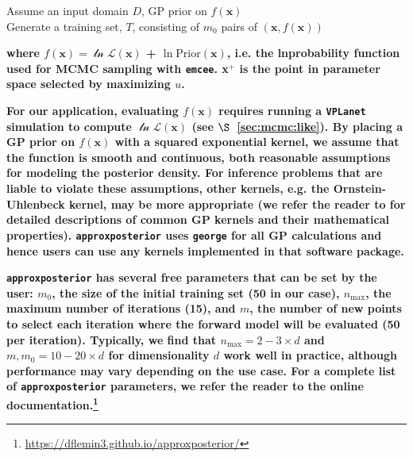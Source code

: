 \documentclass[twocolumn]{aastex62}
\newcommand{\xxx}[1]{{\textbf{#1}}}
\newcommand{\vplanet}[0]{\texttt{VPLanet}\xspace}
\newcommand{\emcee}[0]{\texttt{emcee}\xspace}
\newcommand{\approxposterior}[0]{\texttt{approxposterior}\xspace}
\begin{document}
\begin{algorithm}[H] \label{app:algo}
\SetAlgoLined
 Assume an input domain $D$, GP prior on $f(\textbf{x})$ \\
 Generate a training set, $T$, consisting of $m_0$ pairs of $(\textbf{x}, f(\textbf{x}))$ \\
\caption{\approxposterior Approximate Inference Pseudo Code}
\end{algorithm}
\xxx{where $f(\textbf{x}) = \mathcal{\ln L}(\textbf{x})$ + $\ln \mathrm{Prior}(\textbf{x})$, i.e. the lnprobability function used for MCMC sampling with \emcee. \textbf{x}$^+$ is the point in parameter space selected by maximizing $u$.} 

\xxx{For our application, evaluating $f(\textbf{x})$ requires running a \vplanet simulation to compute $\mathcal{\ln L}(\textbf{x})$ (see $\S$~\ref{sec:mcmc:like}). By placing a GP prior on $f(\textbf{x})$ with a squared exponential kernel, we assume that the function is smooth and continuous, both reasonable assumptions for modeling the posterior density. For inference problems that are liable to violate these assumptions, other kernels, e.g. the Ornstein-Uhlenbeck kernel, may be more appropriate (we refer the reader to \citet{Rasmussen2006} for detailed descriptions of common GP kernels and their mathematical properties). \approxposterior uses \texttt{george} \citep{george} for all GP calculations and hence users can use any kernels implemented in that software package.} 

\xxx{\approxposterior has several free parameters that can be set by the user: $m_0$, the size of the initial training set (50 in our case), $n_{\mathrm{max}}$, the maximum number of iterations (15), and $m$, the number of new points to select each iteration where the forward model will be evaluated (50 per iteration). Typically, we find that $n_{\mathrm{max}}=2-3 \times d$ and $m, m_0 = 10-20 \times d$ for dimensionality $d$ work well in practice, although performance may vary depending on the use case. For a complete list of \approxposterior parameters, we refer the reader to the online documentation.\footnote{ \href{https://dflemin3.github.io/approxposterior}{https://dflemin3.github.io/approxposterior/}}}
\end{document}
